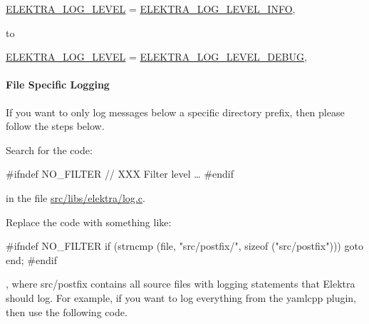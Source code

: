 \begin{DoxyCode}
\hyperlink{kdblogger_8h_a4096a2ccd61c6f5ad60e9015fd1bbb4ba21501cbc3aa651fb5fdc0ed1e0c5c5eb}{ELEKTRA\_LOG\_LEVEL} = \hyperlink{kdblogger_8h_a4096a2ccd61c6f5ad60e9015fd1bbb4ba01618746c91d9d1090f599f604b9b832}{ELEKTRA\_LOG\_LEVEL\_INFO},
\end{DoxyCode}


to


\begin{DoxyCode}
\hyperlink{kdblogger_8h_a4096a2ccd61c6f5ad60e9015fd1bbb4ba21501cbc3aa651fb5fdc0ed1e0c5c5eb}{ELEKTRA\_LOG\_LEVEL} = \hyperlink{kdblogger_8h_a4096a2ccd61c6f5ad60e9015fd1bbb4ba24c7a4c44a8b99b978dc99806d083386}{ELEKTRA\_LOG\_LEVEL\_DEBUG},
\end{DoxyCode}


\paragraph*{File Specific Logging}

If you want to only log messages below a specific directory prefix, then please follow the steps below.


\begin{DoxyEnumerate}
\item Search for the code\+:
\end{DoxyEnumerate}


\begin{DoxyCode}
\textcolor{preprocessor}{#ifndef NO\_FILTER}
     \textcolor{comment}{// XXX Filter level …}
\textcolor{preprocessor}{#endif}
\end{DoxyCode}


in the file {\ttfamily \hyperlink{log_8c}{src/libs/elektra/log.\+c}}.


\begin{DoxyEnumerate}
\item Replace the code with something like\+:
\end{DoxyEnumerate}


\begin{DoxyCode}
\textcolor{preprocessor}{#ifndef NO\_FILTER}
     \textcolor{keywordflow}{if} (strncmp (file, \textcolor{stringliteral}{"src/postfix/"}, \textcolor{keyword}{sizeof} (\textcolor{stringliteral}{"src/postfix"}))) \textcolor{keywordflow}{goto} end;
\textcolor{preprocessor}{#endif}
\end{DoxyCode}


, where {\ttfamily src/postfix} contains all source files with logging statements that Elektra should log. For example, if you want to log everything from the {\ttfamily yamlcpp} plugin, then use the following code.


